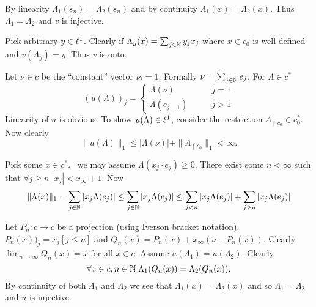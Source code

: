 \begin{enumerate}
\begin{itemize}
By linearity \(\Lambda_1(s_n) = \Lambda_2(s_n)\)
and by continuity \(\Lambda_1(x) = \Lambda_2(x)\).
Thus \(\Lambda_1 = \Lambda_2\) and $v$ is injective.

Pick arbitrary \(y \in \ell^1\).
Clearly if \(\Lambda_y(x) = \sum_{j\in\mathbb{N}} y_j x_j\) where \(x\in c_0\)
is well defined and \(v(\Lambda_y) = y\). Thus $v$ is onto.


Let \(\nu\in c\) be the ``constant'' vector \(\nu_i = 1\).
Formally \(\nu = \sum_{j\in\mathbb{N}} e_j\).
For \(\Lambda \in c^*\)
\begin{equation*}
\left(u(\Lambda)\right)_j =
 \left\{
   \begin{array}{ll}
     \Lambda(\nu) \qquad & j=1 \\
     \Lambda(e_{j-1}) \qquad & j > 1
   \end{array}
  \right.
\end{equation*}
Linearity of $u$ is obvious.
To show \(u(\Lambda)\in\ellone\), consider the restriction
\(\Lambda_{\restriction {c_0}} \in c_0^*\).
Now clearly
\begin{equation*}
\|u(\Lambda)\|_1 \leq |\Lambda(\nu)| + \|\Lambda_{\restriction {c_0}}\|_1 < \infty.
\end{equation*}

\iffalse
To show \(u(\Lambda)\in\ellone\)
Let \(\mu\in c\) defined by \(\mu_j = \overline{\Lambda(e_j)}\).
Let \(a_\Lambda \in \ellinf\) defined by
\((a_\Lambda)_j = \exp(-i\arg(\Lambda(e_j)\) if defined or $1$ otherwise.
Thus  \(|(a_\Lambda)_j|=1\) and
\(\Lambda((a_\Lambda)_j\cdot e_j) = \Lambda(e_j)|\).
Let \(\mu_\Lambda(x) : c \to c\) defined by
\(\mu_\Lambda(x)_j = (a_\Lambda)_j \cdot x_j\).
\fi

Pick some \(x\in c^*\).
\Wlogy\ we may assume \(\Lambda(x_j\cdot e_j) \geq 0\).
There exist some \(n < \infty\) such that
\(\forall j\geq n\; |x_j| < x_\infty + 1\). Now
\begin{align*}
\|\Lambda(x)\|_1
= \sum_{j\in\mathbb{N}} |x_j\Lambda(e_j)|
\leq \sum_{j\in\mathbb{N}} |x_j\Lambda(e_j)|
\leq \sum_{j< n} |x_j\Lambda(e_j)|
     + \sum_{j\geq n} |x_j\Lambda(e_j)|
\end{align*}

Let \(P_n: c\to c\) be a projection (using Iverson bracket notation).
\(P_n(x))_j = x_j[j \leq n]\)
and \(Q_n(x) = P_n(x) + x_\infty (\nu - P_n(x))\).
Clearly \(\lim_{n\to\infty}Q_n(x) = x\) for all \(x\in c\).
Assume \(u(\Lambda_1) = u(\Lambda_2)\).
Clearly
\begin{equation*}
\forall x\in c,n\in\mathbb{N}\;\Lambda_1(Q_n(x)) = \Lambda_2(Q_n(x)).
\end{equation*}
By continuity of both \(\Lambda_1\) and \(\Lambda_2\)
we see that 
\(\Lambda_1(x) = \Lambda_2(x)\) and so
\(\Lambda_1 = \Lambda_2\) and $u$ is injective.


\end{itemize}
\end{enumerate}
